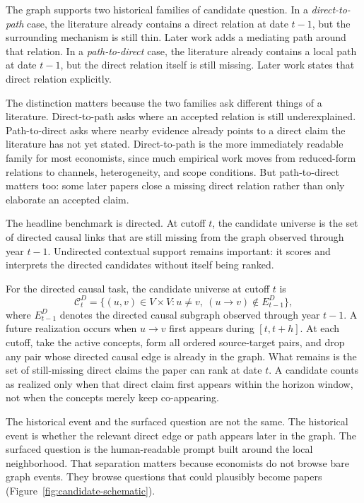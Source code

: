 \documentclass[11pt]{article}
\begin{document}
The graph supports two historical families of candidate question. In a \emph{direct-to-path} case, the literature already contains a direct relation at date \(t-1\), but the surrounding mechanism is still thin. Later work adds a mediating path around that relation. In a \emph{path-to-direct} case, the literature already contains a local path at date \(t-1\), but the direct relation itself is still missing. Later work states that direct relation explicitly.

The distinction matters because the two families ask different things of a literature. Direct-to-path asks where an accepted relation is still underexplained. Path-to-direct asks where nearby evidence already points to a direct claim the literature has not yet stated. Direct-to-path is the more immediately readable family for most economists, since much empirical work moves from reduced-form relations to channels, heterogeneity, and scope conditions. But path-to-direct matters too: some later papers close a missing direct relation rather than only elaborate an accepted claim.

The headline benchmark is directed. At cutoff \(t\), the candidate universe is the set of directed causal links that are still missing from the graph observed through year \(t-1\). Undirected contextual support remains important: it scores and interprets the directed candidates without itself being ranked.

For the directed causal task, the candidate universe at cutoff \(t\) is
\[
\mathcal{C}^{D}_{t}=\{(u,v)\in V\times V: u\neq v,\ (u\rightarrow v)\notin E^{D}_{t-1}\},
\]
where \(E^{D}_{t-1}\) denotes the directed causal subgraph observed through year \(t-1\). A future realization occurs when \(u \rightarrow v\) first appears during \([t,t+h]\). At each cutoff, take the active concepts, form all ordered source-target pairs, and drop any pair whose directed causal edge is already in the graph. What remains is the set of still-missing direct claims the paper can rank at date \(t\). A candidate counts as realized only when that direct claim first appears within the horizon window, not when the concepts merely keep co-appearing.

The historical event and the surfaced question are not the same. The historical event is whether the relevant direct edge or path appears later in the graph. The surfaced question is the human-readable prompt built around the local neighborhood. That separation matters because economists do not browse bare graph events. They browse questions that could plausibly become papers (Figure~\ref{fig:candidate-schematic}).
\end{document}
